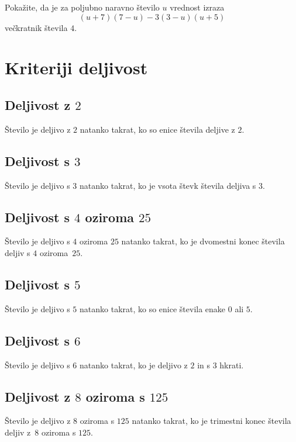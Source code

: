     
        \begin{naloga}
            Pokažite, da je za poljubno naravno število $u$ vrednost izraza $$(u+7)(7-u)-3(3-u)(u+5)$$ večkratnik števila $4$.
        \end{naloga}        

\newpage
    \section{Kriteriji deljivost}
    
        \subsection*{Deljivost z $2$}
            Število je deljivo z $2$ natanko takrat, ko so enice števila deljive z $2$.

        \subsection*{Deljivost s $3$}
            Število je deljivo s $3$ natanko takrat, ko je vsota števk števila deljiva s $3$.

        \subsection*{Deljivost s $4$ oziroma $25$}
            Število je deljivo s $4$ oziroma $25$ natanko takrat, ko je dvomestni konec števila deljiv s $4$ oziroma~$25$.

        \subsection*{Deljivost s $5$}
            Število je deljivo s $5$ natanko takrat, ko so enice števila enake $0$ ali $5$.
    
        \subsection*{Deljivost s $6$}
            Število je deljivo s $6$ natanko takrat, ko je deljivo z $2$ in s $3$ hkrati.

        \subsection*{Deljivost z $8$ oziroma s $125$}
            Število je deljivo z $8$ oziroma s $125$ natanko takrat, ko je trimestni konec števila deljiv z~$8$ oziroma s $125$.


